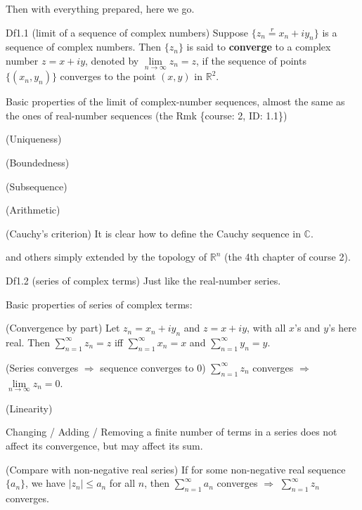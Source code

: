 \documentclass{article}
\begin{document}
Then with everything prepared, here we go. 

\begin{Df}{Df1.1 (limit of a sequence of complex numbers)}
    Suppose $\{z_n \overset{r}{=} x_n+iy_n\}$ is a sequence of complex numbers. Then $\{z_n\}$ is said to \textbf{converge} to a complex number $z = x+iy$, denoted by $\lim\limits_{n\to\infty} z_n = z$, if the sequence of points $\{(x_n, y_n)\}$ converges to the point $(x, y)$ in $\mathbb{R}^2$.
\end{Df}

\begin{Rmk}{}
    \textcolor{Th}{Basic properties of the limit of complex-number sequences, almost the same as the ones of real-number sequences (the Rmk \{course: 2, ID: 1.1\})
    \begin{compactenum}
        \item (Uniqueness)
        \item (Boundedness)
        \item (Subsequence)
        \item (Arithmetic)
        \item (Cauchy's criterion) It is clear how to define the Cauchy sequence in $\mathbb{C}$.
    \end{compactenum}}
    and others simply extended by the topology of $\mathbb{R}^n$ (the 4th chapter of course 2).
\end{Rmk}

\begin{Df}{Df1.2 (series of complex terms)}
    Just like the real-number series.
\end{Df}

\begin{Rmk}{}
    \textcolor{Th}{Basic properties of series of complex terms:
    \begin{compactenum}
        \item (Convergence by part) Let $z_n = x_n+iy_n$ and $z=x+iy$, with all $x$'s and $y$'s here real. Then $\sum_{n=1}^{\infty} z_n = z$ iff $\sum_{n=1}^{\infty} x_n = x$ and $\sum_{n=1}^{\infty} y_n = y$.
        \item (Series converges $\Rightarrow$ sequence converges to $0$) $\sum_{n=1}^{\infty} z_n$ converges $\Rightarrow$ $\lim\limits_{n\to\infty} z_n = 0$.
        \item (Linearity)
        \item Changing / Adding / Removing a finite number of terms in a series does not affect its convergence, but may affect its sum.
        \item (Compare with non-negative real series) If for some non-negative real sequence $\{a_n\}$, we have $|z_n|\leq a_n$ for all $n$, then $\sum_{n=1}^{\infty} a_n$ converges $\Rightarrow$ $\sum_{n=1}^{\infty} z_n$ converges.
    \end{compactenum}}
\end{Rmk}
\end{document}

